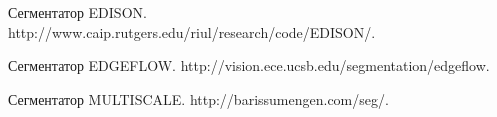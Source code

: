 \begin{multicols}{2}
{{\begin{thebibliography}{99}
  \label{end\stat}
  
  Сегментатор EDISON. {\sf http://www.caip.rutgers.edu/\linebreak riul/research/code/EDISON/}.
  
  Сегментатор EDGEFLOW. {\sf http://vision.ece.ucsb.edu/\linebreak segmentation/edgeflow}.
  
  Сегментатор MULTISCALE. {\sf http://barissumengen.\linebreak com/seg/}.
 \end{thebibliography}
}
}


\end{multicols}       